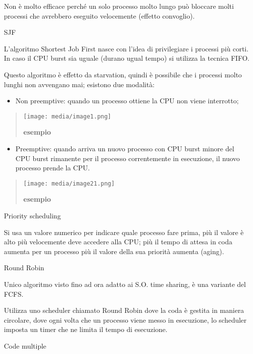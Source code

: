 Non è molto efficace perché un solo processo molto lungo può bloccare
molti processi che avrebbero eseguito velocemente (effetto convoglio).

SJF

L'algoritmo Shortest Job First nasce con l'idea di privilegiare i
processi più corti. In caso il CPU burst sia uguale (durano ugual tempo)
si utilizza la tecnica FIFO.

Questo algoritmo è effetto da starvation, quindi è possibile che i
processi molto lunghi non avvengano mai; esistono due modalità:

\begin{itemize}
\item
  Non preemptive: quando un processo ottiene la CPU non viene
  interrotto;
\end{itemize}

\begin{quote}
\texttt{[image: media/image1.png]}

\textbf{esempio}
\end{quote}

\begin{itemize}
\item
  Preemptive: quando arriva un nuovo processo con CPU burst minore del
  CPU burst rimanente per il processo correntemente in esecuzione, il
  nuovo processo prende la CPU.
\end{itemize}

\begin{quote}
\texttt{[image: media/image21.png]}

\textbf{esempio}
\end{quote}

Priority scheduling

Si usa un valore numerico per indicare quale processo fare prima, più il
valore è alto più velocemente deve accedere alla CPU; più il tempo di
attesa in coda aumenta per un processo più il valore della sua priorità
aumenta (aging).

Round Robin

Unico algoritmo visto fino ad ora adatto ai S.O. time sharing, è una
variante del FCFS.

Utilizza uno scheduler chiamato Round Robin dove la coda è gestita in
maniera circolare, dove ogni volta che un processo viene messo in
esecuzione, lo scheduler imposta un timer che ne limita il tempo di
esecuzione.

Code multiple

